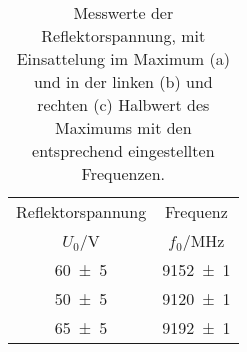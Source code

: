 \begin{table}[!h]
	\centering
	\begin{tabular}{cc}
		\toprule
		Reflektorspannung & Frequenz\\
		$U_0$/\si{V} & $f_0$/\si{MHz}\\
\midrule
		\num{60(5)} & \num{9152(1)}\\
		\num{50(5)} & \num{9120(1)}\\
		\num{65(5)} & \num{9192(1)}\\
		\bottomrule
	\end{tabular}
	\caption{Messwerte der Reflektorspannung, mit Einsattelung im Maximum (a)
                    und in der linken (b) und rechten (c) Halbwert des Maximums mit den 
                    entsprechend eingestellten Frequenzen.
                 \label{tab:Elektrische Abstimmung}}
\end{table}
